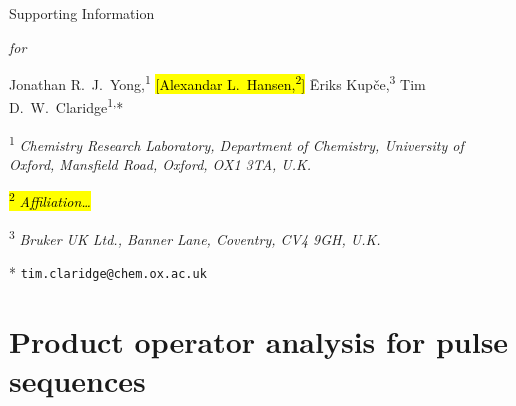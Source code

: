 \newcommand{\sectionbreak}{\clearpage}
\renewcommand*{\thefigure}{S\arabic{figure}}
\renewcommand*{\thetable}{S\arabic{table}}
\renewcommand*{\thepage}{S\arabic{page}}
\setcounter{page}{1}
\setcounter{figure}{0}
\setcounter{table}{0}
\onehalfspacing
\hspace{0pt}
\vfill
\begin{center}
    \huge
    Supporting Information

    \textit{for}

    \hsqctitle{}

    \vspace{1cm}

    \Large Jonathan R.\ J.\ Yong,\textsuperscript{1} \hl{[Alexandar L.\ Hansen,\textsuperscript{2}]} {\=E}riks Kup{\v{c}}e,\textsuperscript{3} Tim D.\ W.\ Claridge\textsuperscript{1,}*

    \vspace{1cm}

    \large \textsuperscript{1} \textit{Chemistry Research Laboratory, Department of Chemistry, University of Oxford, Mansfield Road, Oxford, OX1 3TA, U.K.}

    \hl{\textsuperscript{2} \textit{Affiliation\ldots}}

    \textsuperscript{3} \textit{Bruker UK Ltd., Banner Lane, Coventry, CV4 9GH, U.K.}

    * \texttt{tim.claridge@chem.ox.ac.uk}
\end{center}
\thispagestyle{empty}
\vfill
\hspace{0pt}
\newpage

\tableofcontents

\newpage

\section{Product operator analysis for pulse sequences}

